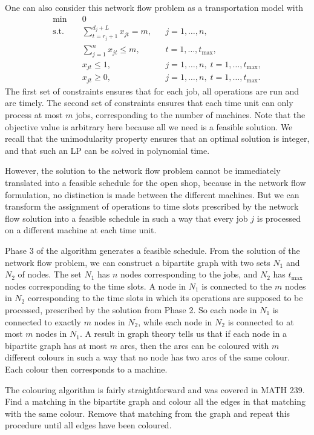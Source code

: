 One can also consider this network flow problem as a transportation model with 
\begin{align*}
    \min\quad & 0 \\ 
    \text{s.t.}\quad & \sum_{t=r_j+1}^{d_j+L} x_{jt} = m, && j = 1, \dots, n, \\ 
    & \sum_{j=1}^n x_{jt} \leq m, && t = 1, \dots, t_{\max}, \\ 
    & x_{jt} \leq 1, && j = 1, \dots, n,\; t = 1, \dots, t_{\max}, \\ 
    & x_{jt} \geq 0, && j = 1, \dots, n,\; t = 1, \dots, t_{\max}. 
\end{align*}
The first set of constraints ensures that for each job, all operations are 
run and are timely. The second set of constraints ensures that each time unit 
can only process at most $m$ jobs, corresponding to the number of machines. 
Note that the objective value is arbitrary here because all we need is a 
feasible solution. We recall that the unimodularity property ensures that 
an optimal solution is integer, and that such an LP can be solved in 
polynomial time. 

However, the solution to the network flow problem cannot be immediately 
translated into a feasible schedule for the open shop, because in the 
network flow formulation, no distinction is made between the different 
machines. But we can transform the assignment of operations to time slots 
prescribed by the network flow solution into a feasible schedule in 
such a way that every job $j$ is processed on a different machine 
at each time unit. 

Phase 3 of the algorithm generates a feasible schedule. From the 
solution of the network flow problem, we can construct a bipartite graph 
with two sets $N_1$ and $N_2$ of nodes. The set $N_1$ has $n$ nodes 
corresponding to the jobs, and $N_2$ has $t_{\max}$ nodes corresponding 
to the time slots. A node in $N_1$ is connected to the $m$ nodes in 
$N_2$ corresponding to the time slots in which its operations 
are supposed to be processed, prescribed by the solution from Phase 2. 
So each node in $N_1$ is connected to exactly $m$ nodes in $N_2$, 
while each node in $N_2$ is connected to at most $m$ nodes in $N_1$. 
A result in graph theory tells us that if each node in a bipartite graph 
has at most $m$ arcs, then the arcs can be coloured with $m$ different 
colours in such a way that no node has two arcs of the same colour. 
Each colour then corresponds to a machine. 

The colouring algorithm is fairly straightforward and was covered in 
MATH 239. Find a matching in the bipartite graph and colour all the 
edges in that matching with the same colour. Remove that matching 
from the graph and repeat this procedure until all edges have been coloured. 


